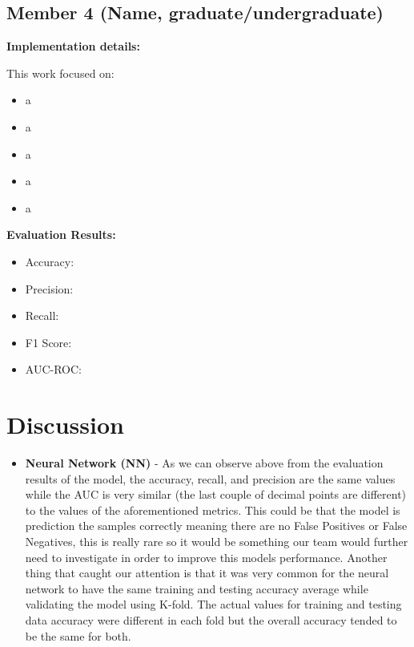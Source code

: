 \documentclass[11pt,a4paper]{article}
\begin{document}
\subsection{Member 4 (Name, graduate/undergraduate)}

\begin{tcolorbox}[
        title=Visualization and Model Evaluation,
        colback=mediumblue!30,
        colframe=darkblue,
        boxrule=0.5pt,
        fonttitle=\bfseries\sffamily\footnotesize,
        fontupper=\footnotesize
    ]
    \textbf{Implementation details:}

    This work focused on:
    \begin{itemize}[leftmargin=*, itemsep=2pt, parsep=0pt]
        \item a
        \item a
        \item a
        \item a
        \item a
    \end{itemize}

    \textbf{Evaluation Results:}
    \begin{itemize}[leftmargin=*, itemsep=2pt, parsep=0pt]
        \item Accuracy:
        \item Precision:
        \item Recall:
        \item F1 Score:
        \item AUC-ROC:
    \end{itemize}
\end{tcolorbox}

\section{Discussion}
\begin{itemize}
    \item \textbf{Neural Network (NN)} - As we can observe above from the evaluation results of the model, the accuracy, recall, and precision are the same values while the AUC is very similar (the last couple of decimal points are different) to the values of the aforementioned metrics. This could be that the model is prediction the samples correctly meaning there are no False Positives or False Negatives, this is really rare so it would be something our team would further need to investigate in order to improve this models performance. Another thing that caught our attention is that it was very common for the neural network to have the same training and testing accuracy average while validating the model using K-fold. The actual values for training and testing data accuracy were different in each fold but the overall accuracy tended to be the same for both.
\end{itemize}
\end{document}
